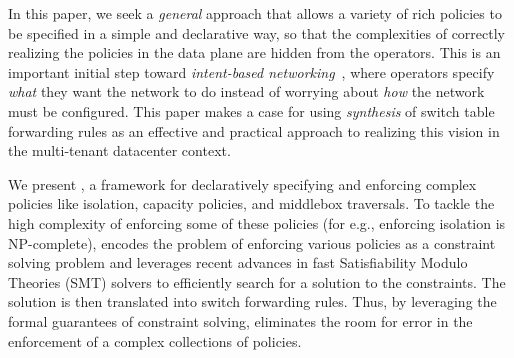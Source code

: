 In this paper, we seek a {\em general} approach that allows a variety
of rich policies to be specified in a simple and declarative way, so
that the complexities of correctly realizing the policies in the data
plane are hidden from the operators. This is an important
initial step toward {\em intent-based networking}~\cite{intent}, where
operators specify {\em what} they want the network to do instead of
worrying about {\em how} the network must be configured.
This paper makes a case for using \emph{synthesis} of switch table
forwarding rules as an effective and practical approach to realizing
this vision in the multi-tenant datacenter context.

We present \Name, a framework for declaratively specifying and
enforcing complex policies 
like isolation, capacity policies, and middlebox
traversals. To tackle the high complexity of enforcing
some of these policies (for e.g., enforcing isolation
is NP-complete),
\Name 
encodes the problem of enforcing various
policies as a constraint solving problem and
leverages recent advances in
fast Satisfiability Modulo Theories (SMT) solvers
to efficiently search for a solution to the constraints. 
The solution is then translated into switch forwarding rules. 
Thus, by leveraging the formal guarantees of constraint solving, \Name
eliminates the room for error in the enforcement of 
a complex collections of policies. 


